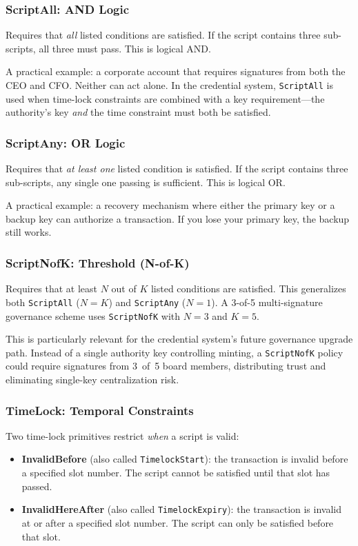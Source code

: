 \subsubsection{ScriptAll: AND Logic}

Requires that \emph{all} listed conditions are satisfied. If the script
contains three sub-scripts, all three must pass. This is logical AND.

A practical example: a corporate account that requires signatures from
both the CEO and CFO. Neither can act alone. In the credential system,
\texttt{ScriptAll} is used when time-lock constraints are combined with
a key requirement---the authority's key \emph{and} the time constraint
must both be satisfied.

\subsubsection{ScriptAny: OR Logic}

Requires that \emph{at least one} listed condition is satisfied. If the
script contains three sub-scripts, any single one passing is sufficient.
This is logical OR.

A practical example: a recovery mechanism where either the primary key
or a backup key can authorize a transaction. If you lose your primary
key, the backup still works.

\subsubsection{ScriptNofK: Threshold (N-of-K)}

Requires that at least $N$ out of $K$ listed conditions are satisfied.
This generalizes both \texttt{ScriptAll} ($N = K$) and \texttt{ScriptAny}
($N = 1$). A 3-of-5 multi-signature governance scheme uses
\texttt{ScriptNofK} with $N = 3$ and $K = 5$.

This is particularly relevant for the credential system's future
governance upgrade path. Instead of a single authority key controlling
minting, a \texttt{ScriptNofK} policy could require signatures from
3~of~5 board members, distributing trust and eliminating single-key
centralization risk.

\subsubsection{TimeLock: Temporal Constraints}

Two time-lock primitives restrict \emph{when} a script is valid:
\begin{itemize}[nosep]
  \item \textbf{InvalidBefore} (also called \texttt{TimelockStart}):
    the transaction is invalid before a specified slot number. The
    script cannot be satisfied until that slot has passed.
  \item \textbf{InvalidHereAfter} (also called \texttt{TimelockExpiry}):
    the transaction is invalid at or after a specified slot number. The
    script can only be satisfied before that slot.
\end{itemize}

